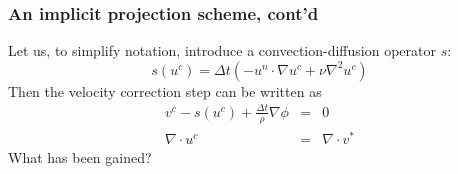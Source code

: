 \begin{frame}
\frametitle{An implicit projection scheme, cont'd}
Let us, to simplify notation, introduce
a convection-diffusion operator $s$: 
\[
s(u^c) =   \Delta t (-u^n \cdot \nabla u^c +  \nu \nabla^2 u^c)  
\]
Then the velocity correction step can be written as 
\begin{eqnarray*}
v^c - s(u^c) + \frac{\Delta t}{\rho} \nabla \phi &=& 0 \\ 
\nabla \cdot u^c &=& \nabla \cdot v^* 
\end{eqnarray*}
What has been gained? 
\end{frame}

